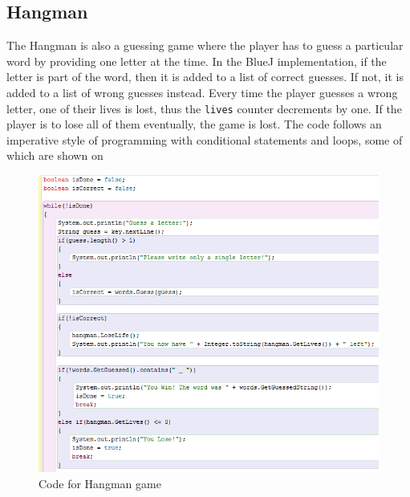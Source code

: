 \subsection{Hangman}
The Hangman is also a guessing game where the player has to guess a particular word by providing one letter at the time. In the BlueJ implementation, if the letter is part of the word, then it is added to a list of correct guesses. If not, it is added to a list of wrong guesses instead. Every time the player guesses a wrong letter, one of their lives is lost, thus the \lstinline!lives! counter decrements by one. If the player is to lose all of them eventually, the game is lost. The code follows an imperative style of programming with conditional statements and loops, some of which are shown on  

\begin{figure}[!h]
  \centering
      \includegraphics[scale=0.7]{./pics/bluej_hangman_code}
      \caption{Code for Hangman game}
      \label{fig:bluej_hangman_code} 
\end{figure}

